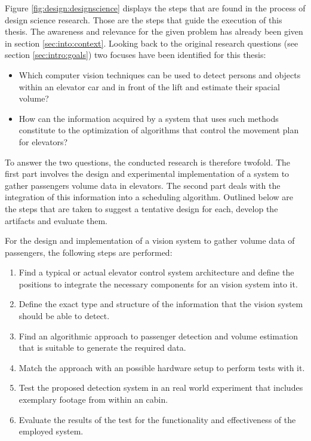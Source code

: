 Figure \ref{fig:design:designscience} displays the steps that are found in the process of design science research. 
Those are the steps that guide the execution of this thesis.
The awareness and relevance for the given problem has already been given in section \vref{sec:into:context}.
Looking back to the original research questions (see section \vref{sec:intro:goals}) two focuses have been identified for this thesis:

\begin{itemize}
    \item Which computer vision techniques can be used to detect persons and objects within an elevator car and in front of the lift and estimate their spacial volume?
    \item How can the information acquired by a system that uses such methods constitute to the optimization of algorithms that control the movement plan for elevators?
\end{itemize}


To answer the two questions, the conducted research is therefore twofold.
The first part involves the design and experimental implementation of a system to gather passengers volume data in elevators.
The second part deals with the integration of this information into a scheduling algorithm.
Outlined below are the steps that are taken to
suggest a tentative design for each, develop the artifacts and evaluate them.

For the  design and implementation of a vision system to gather volume data of passengers,
the following steps are performed:

\begin{enumerate}
    \item Find a typical or actual elevator control system architecture and define the positions to integrate the necessary components for an vision system into it.
    \item Define the exact type and structure of the information that the vision system should be able to detect.
    \item Find an algorithmic approach to  passenger detection and volume estimation that is suitable to generate the required data.
    \item Match the approach with an possible hardware setup to perform tests with it.
    \item Test the proposed detection system in an real world experiment that includes  exemplary footage from within an cabin.
    \item Evaluate the results of the test for the functionality and effectiveness of the employed system.
\end{enumerate}

